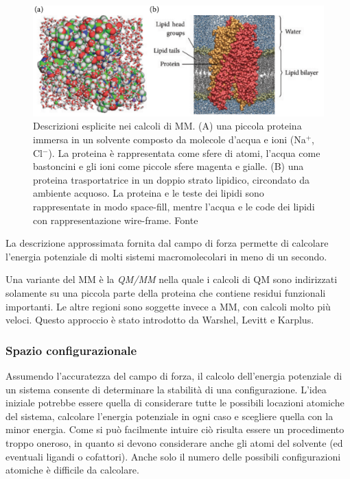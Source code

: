 \begin{figure}[!htb]
	\centering
	\includegraphics[scale=0.4]{images/esplicita-mm.png}
	\caption{Descrizioni esplicite nei calcoli di MM. (A) una piccola proteina immersa in un solvente composto da molecole d'acqua e ioni (Na$^{+}$, Cl$^{-}$). La proteina è rappresentata come sfere di atomi, l'acqua come bastoncini e gli ioni come piccole sfere magenta e gialle. (B) una proteina trasportatrice in un doppio strato lipidico, circondato da ambiente acquoso. La proteina e le teste dei lipidi sono rappresentate in modo space-fill, mentre l'acqua e le code dei lipidi con rappresentazione wire-frame. Fonte \cite{kessel_ben-tal_2018}}
	\label{fig:descrizione-esplicita-mm}
\end{figure}

\par La descrizione approssimata fornita dal campo di forza permette di calcolare l'energia potenziale di molti sistemi macromolecolari in meno di un secondo. \\

\par Una variante del MM è la \textit{QM/MM} nella quale i calcoli di QM sono indirizzati solamente su una piccola parte della proteina che contiene residui funzionali importanti. Le altre regioni sono soggette invece a MM, con calcoli molto più veloci. Questo approccio è stato introdotto da Warshel, Levitt e Karplus.

\subsubsection{Spazio configurazionale}

\par Assumendo l'accuratezza del campo di forza, il calcolo dell'energia potenziale di un sistema consente di determinare la stabilità di una configurazione. L'idea iniziale potrebbe essere quella di considerare tutte le possibili locazioni atomiche del sistema, calcolare l'energia potenziale in ogni caso e scegliere quella con la minor energia. Come si può facilmente intuire ciò risulta essere un procedimento troppo oneroso, in quanto si devono considerare anche gli atomi del solvente (ed eventuali ligandi o cofattori). Anche solo il numero delle possibili configurazioni atomiche è difficile da calcolare.

